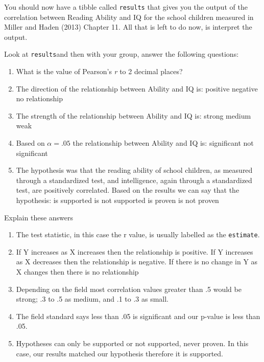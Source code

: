 \documentclass[]{book}
\providecommand{\tightlist}{%
  \setlength{\itemsep}{0pt}\setlength{\parskip}{0pt}}
\begin{document}
You should now have a tibble called \texttt{results} that gives you the output of the correlation between Reading Ability and IQ for the school children measured in Miller and Haden (2013) Chapter 11. All that is left to do now, is interpret the output.

Look at \texttt{results}and then with your group, answer the following questions:

\begin{enumerate}
\def\labelenumi{\arabic{enumi}.}
\tightlist
\item
  What is the value of Pearson's \emph{r} to 2 decimal places? 
\item
  The direction of the relationship between Ability and IQ is: positive negative no relationship
\item
  The strength of the relationship between Ability and IQ is: strong medium weak
\item
  Based on \(\alpha = .05\) the relationship between Ability and IQ is: significant not significant
\item
  The hypothesis was that the reading ability of school children, as measured through a standardized test, and intelligence, again through a standardized test, are positively correlated. Based on the results we can say that the hypothesis: is supported is not supported is proven is not proven
\end{enumerate}

Explain these answers

\begin{enumerate}
\def\labelenumi{\arabic{enumi}.}
\tightlist
\item
  The test statistic, in this case the r value, is usually labelled as the \texttt{estimate}.
\item
  If Y increases as X increases then the relationship is positive. If Y increases as X decreases then the relationship is negative. If there is no change in Y as X changes then there is no relationship
\item
  Depending on the field most correlation values greater than .5 would be strong; .3 to .5 as medium, and .1 to .3 as small.
\item
  The field standard says less than .05 is significant and our p-value is less than .05.
\item
  Hypotheses can only be supported or not supported, never proven. In this case, our results matched our hypothesis therefore it is supported.
\end{enumerate}
\end{document}
